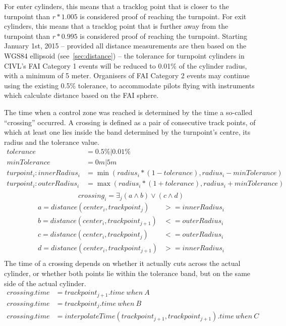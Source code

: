 \documentclass{article}
\begin{document}
For enter cylinders, this means that a tracklog point that is closer to the
turnpoint than \(r*1.005\) is considered proof of reaching the turnpoint. For
exit cylinders, this means that a tracklog point that is further away from the
turnpoint than \(r*0.995\) is considered proof of reaching the turnpoint.
Starting January 1st, 2015 – provided all distance measurements are then based
on the WGS84 ellipsoid (see~\ref{sec:distance}) – the tolerance for turnpoint
cylinders in CIVL’s FAI Category 1 events will be reduced to 0.01\% of the
cylinder radius, with a minimum of 5 meter. Organisers of FAI Category 2 events
may continue using the existing 0.5\% tolerance, to accommodate pilots flying
with instruments which calculate distance based on the FAI sphere.

The time when a control zone was reached is determined by the time a so-called
“crossing” occurred. A crossing is defined as a pair of consecutive track
points, of which at least one lies inside the band determined by the
turnpoint’s centre, its radius and the tolerance value.
\begin{align*}
    tolerance &= 0.5\% | 0.01\% \\
    minTolerance &= 0m | 5m \\
    turpoint_i : innerRadius_i &= \min(radius_i * (1 - tolerance), radius_i - minTolerance) \\
    turpoint_i : outerRadius_i &= \max(radius_i * (1 + tolerance), radius_i + minTolerance) \\
\end{align*}
\begin{equation*}
    crossing_i = \exists_j (a \land b) \lor (c \land d)
\end{equation*}
\begin{align*}
    a = distance(center_i, trackpoint_j) &>= innerRadius_i \\
    b = distance(center_i, trackpoint_{j+1}) &<= outerRadius_i \\
    c = distance(center_i, trackpoint_j) &<= outerRadius_i \\
    d = distance(center_i, trackpoint_{j+1}) &>= innerRadius_i \\
\end{align*}
The time of a crossing depends on whether it actually cuts across the actual
cylinder, or whether both points lie within the tolerance band, but on the same
side of the actual cylinder.
\begin{align*}
    crossing . time &= trackpoint_{j+1} . time \ when \ A \\
    crossing . time &= trackpoint_j . time \ when \ B \\
    crossing . time &= interpolateTime(trackpoint_{j+1}, trackpoint_{j+1}) . time \ when \ C \\
\end{align*}
\end{document}
